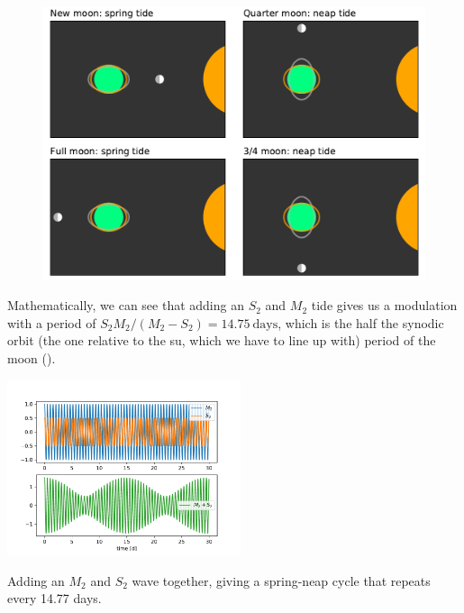 \begin{figure}[hbt]
  \begin{center}
    \includegraphics{figs/Waves/TidalBulges}
    \caption{}
    \label{fig:Schematic of tidal bulges due to moon and sun during the four phases of the moon. When the bulges line up (new and full moon) there is a spring tide, and when they are at 90 degrees it is a neap tide.  A new moon occurs ever 29.53 days.  }  
  \end{center}
\end{figure}

Mathematically, we can see that adding an $S_2$ and $M_2$ tide gives us a modulation with a period of  $S_2 M_2 / (M_2 - S_2) = 14.75\ \mathrm{days}$, which is the half the synodic orbit  (the one relative to the su, which we have to line up with) period of the moon ().  

\begin{marginfigure}
    \includegraphics[width=2.7in]{figs/Waves/M2S2}
    \caption{Adding an $M_2$ and $S_2$ wave together, giving a spring-neap cycle that repeats every 14.77 days.}
    \label{fig:M2S2}
\end{marginfigure}

